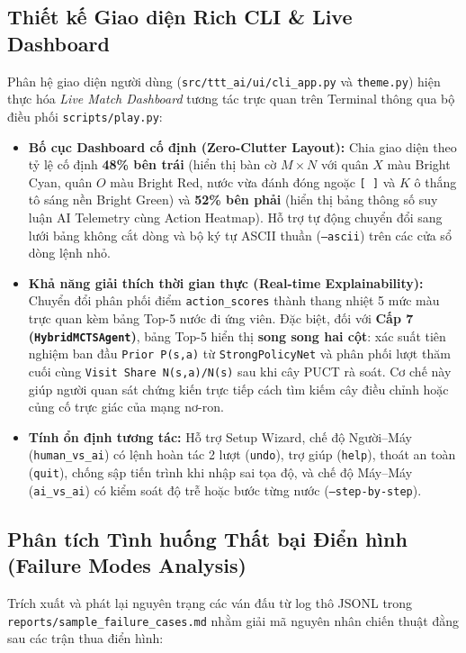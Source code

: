 \documentclass[a4paper,12pt]{report}
\begin{document}
\subsection{Thiết kế Giao diện Rich CLI \& Live Dashboard}
Phân hệ giao diện người dùng (\texttt{src/ttt\_\allowbreak ai/\allowbreak ui/cli\_\allowbreak app.py} và \texttt{theme.py}) hiện thực hóa \textit{Live Match Dashboard} tương tác trực quan trên Terminal thông qua bộ điều phối \texttt{scripts/play.py}:
\begin{itemize}[leftmargin=1.2cm]
    \item \textbf{Bố cục Dashboard cố định (Zero-Clutter Layout):} Chia giao diện theo tỷ lệ cố định \textbf{48\% bên trái} (hiển thị bàn cờ $M \times N$ với quân $X$ màu Bright Cyan, quân $O$ màu Bright Red, nước vừa đánh đóng ngoặc \texttt{[ ]} và $K$ ô thắng tô sáng nền Bright Green) và \textbf{52\% bên phải} (hiển thị bảng thông số suy luận AI Telemetry cùng Action Heatmap). Hỗ trợ tự động chuyển đổi sang lưới bảng không cắt dòng và bộ ký tự ASCII thuần (\texttt{--ascii}) trên các cửa sổ dòng lệnh nhỏ.
    \item \textbf{Khả năng giải thích thời gian thực (Real-time Explainability):} Chuyển đổi phân phối điểm \texttt{action\_\allowbreak scores} thành thang nhiệt 5 mức màu trực quan kèm bảng Top-5 nước đi ứng viên. Đặc biệt, đối với \textbf{Cấp 7 (\texttt{HybridMCTSAgent})}, bảng Top-5 hiển thị \textbf{song song hai cột}: xác suất tiên nghiệm ban đầu \texttt{Prior P(s,a)} từ \texttt{StrongPolicyNet} và phân phối lượt thăm cuối cùng \texttt{Visit Share N(s,a)/N(s)} sau khi cây PUCT rà soát. Cơ chế này giúp người quan sát chứng kiến trực tiếp cách tìm kiếm cây điều chỉnh hoặc củng cố trực giác của mạng nơ-ron.
    \item \textbf{Tính ổn định tương tác:} Hỗ trợ Setup Wizard, chế độ Người--Máy (\texttt{human\_\allowbreak vs\_\allowbreak ai}) có lệnh hoàn tác 2 lượt (\texttt{undo}), trợ giúp (\texttt{help}), thoát an toàn (\texttt{quit}), chống sập tiến trình khi nhập sai tọa độ, và chế độ Máy--Máy (\texttt{ai\_\allowbreak vs\_\allowbreak ai}) có kiểm soát độ trễ hoặc bước từng nước (\texttt{--step-by-step}).
\end{itemize}

\subsection{Phân tích Tình huống Thất bại Điển hình (Failure Modes Analysis)}
Trích xuất và phát lại nguyên trạng các ván đấu từ log thô JSONL trong \texttt{reports/\allowbreak sample\_\allowbreak failure\_\allowbreak cases.md} nhằm giải mã nguyên nhân chiến thuật đằng sau các trận thua điển hình:
\end{document}
